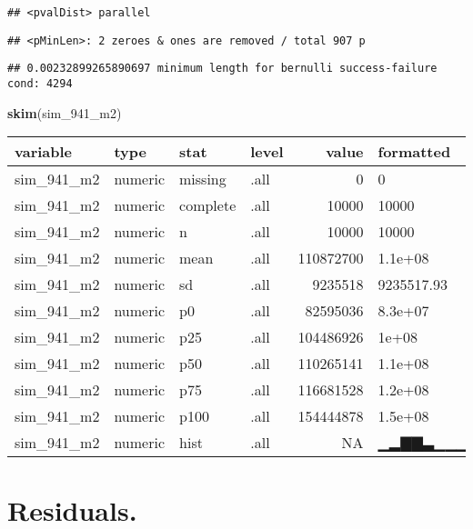 \documentclass[]{article}
\newenvironment{Shaded}{\begin{snugshade}}{\end{snugshade}}
\newcommand{\DecValTok}[1]{\textcolor[rgb]{0.00,0.00,0.81}{#1}}
\newcommand{\KeywordTok}[1]{\textcolor[rgb]{0.13,0.29,0.53}{\textbf{#1}}}
\newcommand{\NormalTok}[1]{#1}
\begin{document}
\begin{verbatim}
## <pvalDist> parallel
\end{verbatim}

\begin{verbatim}
## <pMinLen>: 2 zeroes & ones are removed / total 907 p
\end{verbatim}

\begin{verbatim}
## 0.00232899265890697 minimum length for bernulli success-failure cond: 4294
\end{verbatim}

\begin{Shaded}
\begin{Highlighting}[]
\KeywordTok{skim}\NormalTok{(sim_}\DecValTok{941}\NormalTok{_m2)}
\end{Highlighting}
\end{Shaded}

\begin{tabular}{l|l|l|l|r|l}
\hline
variable & type & stat & level & value & formatted\\
\hline
sim\_941\_m2 & numeric & missing & .all & 0 & 0\\
\hline
sim\_941\_m2 & numeric & complete & .all & 10000 & 10000\\
\hline
sim\_941\_m2 & numeric & n & .all & 10000 & 10000\\
\hline
sim\_941\_m2 & numeric & mean & .all & 110872700 & 1.1e+08\\
\hline
sim\_941\_m2 & numeric & sd & .all & 9235518 & 9235517.93\\
\hline
sim\_941\_m2 & numeric & p0 & .all & 82595036 & 8.3e+07\\
\hline
sim\_941\_m2 & numeric & p25 & .all & 104486926 & 1e+08\\
\hline
sim\_941\_m2 & numeric & p50 & .all & 110265141 & 1.1e+08\\
\hline
sim\_941\_m2 & numeric & p75 & .all & 116681528 & 1.2e+08\\
\hline
sim\_941\_m2 & numeric & p100 & .all & 154444878 & 1.5e+08\\
\hline
sim\_941\_m2 & numeric & hist & .all & NA & ▁▂▇▇▃▁▁▁\\
\hline
\end{tabular}

\hypertarget{residuals.}{%
\section{Residuals.}\label{residuals.}}
\end{document}
